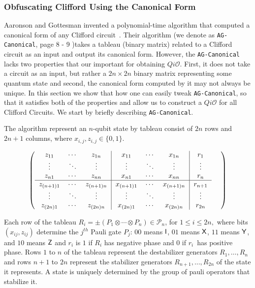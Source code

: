 \subsubsection{Obfuscating Clifford Using the Canonical Form}
\label{sec:Clifford-iO-canonical}
Aaronson and Gottesman invented a polynomial-time algorithm that computed a canonical form of any Clifford circuit~\cite{AG04}. Their algorithm (we denote as {\tt AG-Canonical}, page 8 - 9 \cite{AG04})takes a tableau (binary matrix) related to a Clifford circuit as an input and output its canonical form.  However, the {\tt AG-Canonical} lacks two properties that our important for obtaining $Qi\mathcal{O}.$ First, it does not take a circuit as an input, but rather a $2n \times 2n$ binary matrix representing some quantum state and second, the canonical form computed by it may not always be unique. In this section we show that how one can easily tweak {\tt AG-Canonical}, so that it satisfies both of the properties and allow us to construct a  $Qi\mathcal{O}$ for all Clifford Circuits. We start by briefly describing  {\tt AG-Canonical}.


The algorithm  represent an $n$-qubit state by tableau consist of $2n$ rows and $2n+1$ columns, where $x_{i,j} ,z_{i,j}\in \{0,1\}.$


\[
\left(
\begin{tabular}
[c]{ccc|ccc|c}%
$z_{11}$ & $\cdots$ & $z_{1n}$ & $x_{11}$ & $\cdots$ & $x_{1n}$ & $r_{1}$\\
$\vdots$ & $\ddots$ & $\vdots$ & $\vdots$ & $\ddots$ & $\vdots$ & $\vdots$\\
$z_{n1}$ & $\cdots$ & $z_{nn}$ & $x_{n1}$ & $\cdots$ & $x_{nn}$ & $r_{n}%
$\\\hline
$z_{\left(  n+1\right)  1}$ & $\cdots$ & $z_{\left(  n+1\right)  n}$ &
$x_{\left(  n+1\right)  1}$ & $\cdots$ & $x_{\left(  n+1\right)  n}$ &
$r_{n+1}$\\
$\vdots$ & $\ddots$ & $\vdots$ & $\vdots$ & $\ddots$ & $\vdots$ & $\vdots$\\
$z_{\left(  2n\right)  1}$ & $\cdots$ & $z_{\left(  2n\right)  n}$ &
$x_{\left(  2n\right)  1}$ & $\cdots$ & $x_{\left(  2n\right)  n}$ & $r_{2n}$%
\end{tabular}
\ \ \ \ \right)
\]

Each row  of the tableau $R_{i}=\pm (P_{1}\otimes \cdots \otimes P_{n})\in \mathcal{P}_n$, for $1\leq i\leq 2n,$ where bits $(x_{ij},z_{ij})$ determine the $j^{th}$ Pauli gate $P_{j}$: $00$
means ${\sf I}$, $01$ means ${\sf X}$, $11$ means ${\sf Y}$, and $10$ means ${\sf Z}$ and $r_{i}$ is $1$ if $R_{i}$ has negative phase and $0$ if $r_{i}$\ has
positive phase. Rows $1$ to $n$ of the tableau represent the destabilizer generators $R_{1},\ldots,R_{n}$ and rows $n+1$ to $2n$ represent the stabilizer
generators $R_{n+1},\ldots,R_{2n}$ of the state it represents. A state is uniquely determined by the group of pauli operators that stabilize it.

